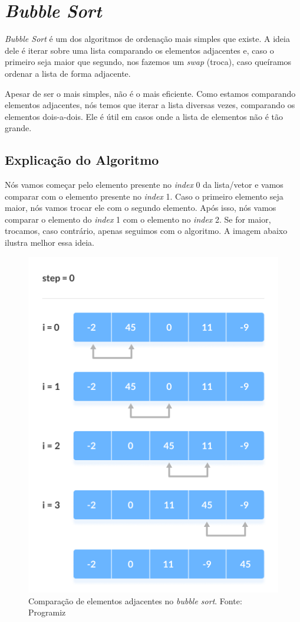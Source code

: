 \section{\textit{Bubble Sort}}

\textit{Bubble Sort} é um dos algoritmos de ordenação mais simples que existe. A ideia dele é iterar sobre uma lista comparando os elementos adjacentes e, caso o primeiro seja maior que segundo, nos fazemos um \textit{swap} (troca), caso queíramos ordenar a lista de forma adjacente.

Apesar de ser o mais simples, não é o mais eficiente. Como estamos comparando elementos adjacentes, nós temos que iterar a lista diversas vezes, comparando os elementos dois-a-dois. Ele é útil em casos onde a lista de elementos não é tão grande.

\subsection{Explicação do Algoritmo}
Nós vamos começar pelo elemento presente no \textit{index} 0 da lista/vetor e vamos comparar com o elemento presente no \textit{index} 1. Caso o primeiro elemento seja maior, nós vamos trocar ele com o segundo elemento. Após isso, nós vamos comparar o elemento do \textit{index} 1 com o elemento no \textit{index} 2. Se for maior, trocamos, caso contrário, apenas seguimos com o algoritmo. A imagem abaixo ilustra melhor essa ideia.
\begin{figure}[H]
    \centering
    \includegraphics[scale=0.5]{assets/bubble_sort.png}
    \caption{Comparação de elementos adjacentes no \textit{bubble sort}. Fonte: Programiz}
    \label{fig:bubble_sort_0}
\end{figure}

